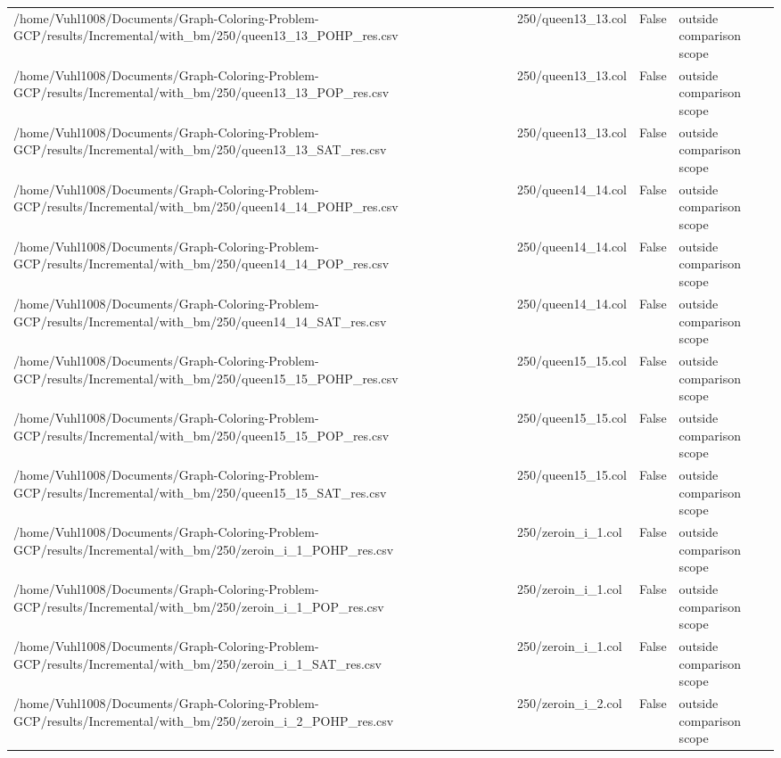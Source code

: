 \begin{table}[htbp]
\begin{tabular}{llll}
/home/Vuhl1008/Documents/Graph-Coloring-Problem-GCP/results/Incremental/with\_bm/250/queen13\_13\_POHP\_res.csv & 250/queen13\_13.col & False & outside comparison scope \\
/home/Vuhl1008/Documents/Graph-Coloring-Problem-GCP/results/Incremental/with\_bm/250/queen13\_13\_POP\_res.csv & 250/queen13\_13.col & False & outside comparison scope \\
/home/Vuhl1008/Documents/Graph-Coloring-Problem-GCP/results/Incremental/with\_bm/250/queen13\_13\_SAT\_res.csv & 250/queen13\_13.col & False & outside comparison scope \\
/home/Vuhl1008/Documents/Graph-Coloring-Problem-GCP/results/Incremental/with\_bm/250/queen14\_14\_POHP\_res.csv & 250/queen14\_14.col & False & outside comparison scope \\
/home/Vuhl1008/Documents/Graph-Coloring-Problem-GCP/results/Incremental/with\_bm/250/queen14\_14\_POP\_res.csv & 250/queen14\_14.col & False & outside comparison scope \\
/home/Vuhl1008/Documents/Graph-Coloring-Problem-GCP/results/Incremental/with\_bm/250/queen14\_14\_SAT\_res.csv & 250/queen14\_14.col & False & outside comparison scope \\
/home/Vuhl1008/Documents/Graph-Coloring-Problem-GCP/results/Incremental/with\_bm/250/queen15\_15\_POHP\_res.csv & 250/queen15\_15.col & False & outside comparison scope \\
/home/Vuhl1008/Documents/Graph-Coloring-Problem-GCP/results/Incremental/with\_bm/250/queen15\_15\_POP\_res.csv & 250/queen15\_15.col & False & outside comparison scope \\
/home/Vuhl1008/Documents/Graph-Coloring-Problem-GCP/results/Incremental/with\_bm/250/queen15\_15\_SAT\_res.csv & 250/queen15\_15.col & False & outside comparison scope \\
/home/Vuhl1008/Documents/Graph-Coloring-Problem-GCP/results/Incremental/with\_bm/250/zeroin\_i\_1\_POHP\_res.csv & 250/zeroin\_i\_1.col & False & outside comparison scope \\
/home/Vuhl1008/Documents/Graph-Coloring-Problem-GCP/results/Incremental/with\_bm/250/zeroin\_i\_1\_POP\_res.csv & 250/zeroin\_i\_1.col & False & outside comparison scope \\
/home/Vuhl1008/Documents/Graph-Coloring-Problem-GCP/results/Incremental/with\_bm/250/zeroin\_i\_1\_SAT\_res.csv & 250/zeroin\_i\_1.col & False & outside comparison scope \\
/home/Vuhl1008/Documents/Graph-Coloring-Problem-GCP/results/Incremental/with\_bm/250/zeroin\_i\_2\_POHP\_res.csv & 250/zeroin\_i\_2.col & False & outside comparison scope \\

\end{tabular}
\end{table}
